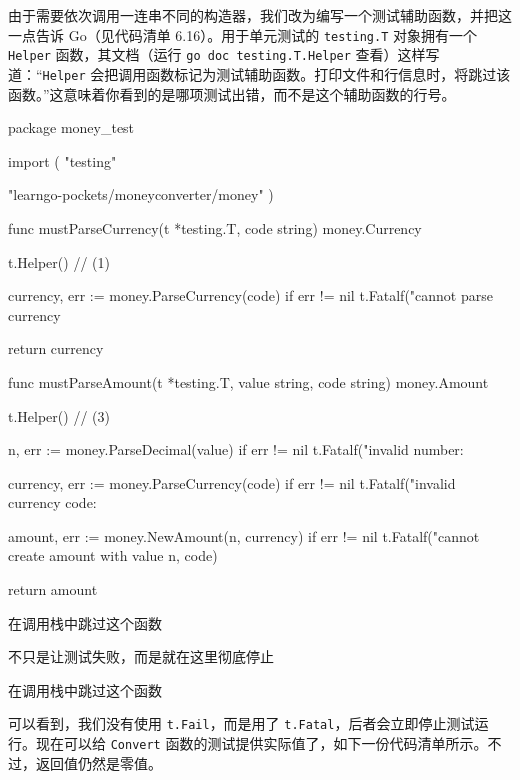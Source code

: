 由于需要依次调用一连串不同的构造器，我们改为编写一个测试辅助函数，并把这一点告诉 Go（见代码清单 6.16）。用于单元测试的 \texttt{testing.T} 对象拥有一个 \texttt{Helper} 函数，其文档（运行 \texttt{go doc testing.T.Helper} 查看）这样写道：“\texttt{Helper} 会把调用函数标记为测试辅助函数。打印文件和行信息时，将跳过该函数。”这意味着你看到的是哪项测试出错，而不是这个辅助函数的行号。

\begin{gocode}[title={代码清单 6.16 \texttt{convert\_test.go}：解析 \texttt{Currency} 和 \texttt{Amount} 的辅助函数}]
package money_test

import (
    "testing"

    "learngo-pockets/moneyconverter/money"
)

func mustParseCurrency(t *testing.T, code string) money.Currency {
    t.Helper() // (1)

    currency, err := money.ParseCurrency(code)
    if err != nil {
        t.Fatalf("cannot parse currency %
    }

    return currency
}

func mustParseAmount(t *testing.T, value string, code string) money.Amount {
    t.Helper() // (3)

    n, err := money.ParseDecimal(value)
    if err != nil {
        t.Fatalf("invalid number: %
    }

    currency, err := money.ParseCurrency(code)
    if err != nil {
        t.Fatalf("invalid currency code: %
    }

    amount, err := money.NewAmount(n, currency)
    if err != nil {
        t.Fatalf("cannot create amount with value %
            n, code)
    }

    return amount
}
\end{gocode}

\begin{codeannotations}
\item 在调用栈中跳过这个函数
\item 不只是让测试失败，而是就在这里彻底停止
\item 在调用栈中跳过这个函数
\end{codeannotations}

可以看到，我们没有使用 \texttt{t.Fail}，而是用了 \texttt{t.Fatal}，后者会立即停止测试运行。现在可以给 \texttt{Convert} 函数的测试提供实际值了，如下一份代码清单所示。不过，返回值仍然是零值。

